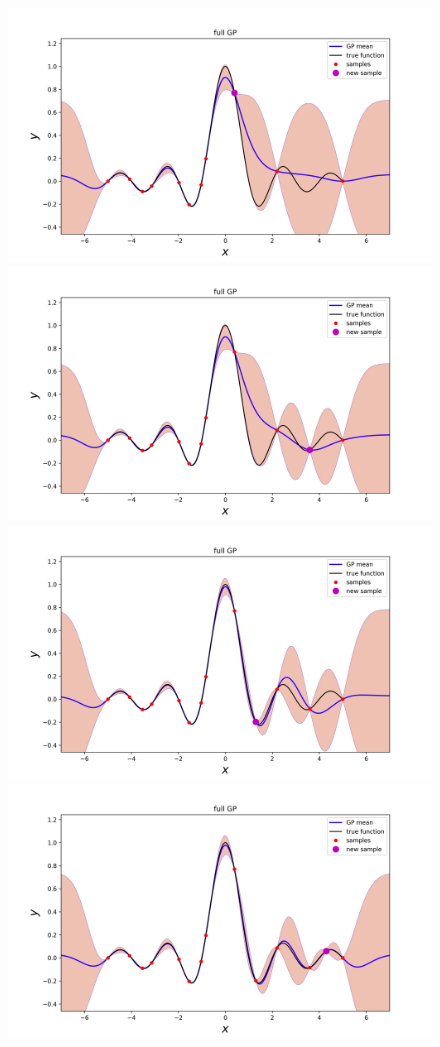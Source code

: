 \documentclass[conference]{IEEEtran}
\begin{document}
\vspace*{-2em}
\begin{figure}[htbp]
    \centering
    \includegraphics[width=0.74\linewidth]{final-project/update/plots/gp-12to20-pt12.png} \vspace*{-1em} \\
    \includegraphics[width=0.74\linewidth]{final-project/update/plots/gp-12to20-pt13.png} \vspace*{-1em} \\
    \includegraphics[width=0.74\linewidth]{final-project/update/plots/gp-12to20-pt14.png} \vspace*{-1em} \\
    \includegraphics[width=0.74\linewidth]{final-project/update/plots/gp-12to20-pt15.png} \vspace*{-1em} \\

\end{figure}
\end{document}
